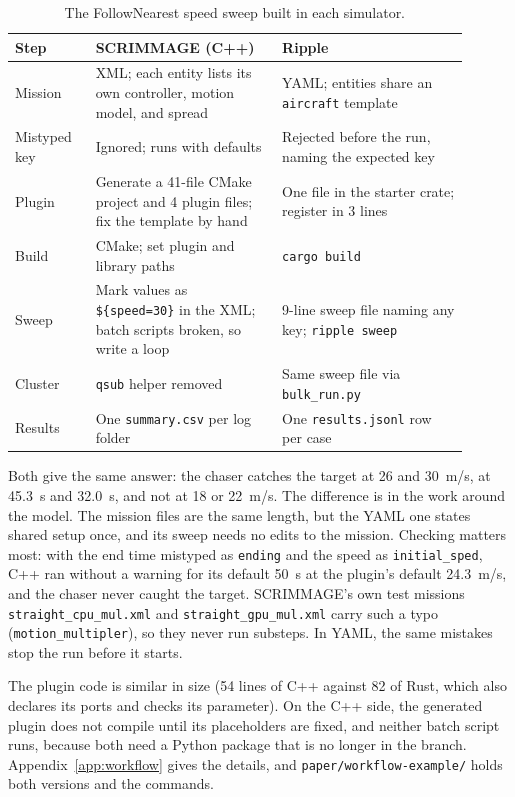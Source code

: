\documentclass[conference]{IEEEtran}
\begin{document}
\begin{table}[t]
\centering
\small
\caption{The FollowNearest speed sweep built in each simulator.}
\label{tab:workflow}
\begin{tabular}{@{}p{0.16\linewidth}p{0.37\linewidth}p{0.37\linewidth}@{}}
\toprule
Step & SCRIMMAGE (C++) & Ripple \\
\midrule
Mission & XML; each entity lists its own controller, motion model, and spread & YAML; entities share an \texttt{aircraft} template \\
Mistyped key & Ignored; runs with defaults & Rejected before the run, naming the expected key \\
Plugin & Generate a 41-file CMake project and 4 plugin files; fix the template by hand & One file in the starter crate; register in 3 lines \\
Build & CMake; set plugin and library paths & \texttt{cargo build} \\
Sweep & Mark values as \texttt{\$\{speed=30\}} in the XML; batch scripts broken, so write a loop & 9-line sweep file naming any key; \texttt{ripple sweep} \\
Cluster & \texttt{qsub} helper removed & Same sweep file via \texttt{bulk\_run.py} \\
Results & One \texttt{summary.csv} per log folder & One \texttt{results.jsonl} row per case \\
\bottomrule
\end{tabular}
\end{table}

Both give the same answer: the chaser catches the target at 26 and 30~m/s, at
45.3~s and 32.0~s, and not at 18 or 22~m/s. The difference is in the work
around the model. The mission files are the same length, but the YAML one
states shared setup once, and its sweep needs no edits to the mission. Checking
matters most: with the end time mistyped as \texttt{ending} and the speed as
\texttt{initial\_sped}, C++ ran without a warning for its default 50~s at the
plugin's default 24.3~m/s, and the chaser never caught the target. SCRIMMAGE's
own test missions \texttt{straight\_cpu\_mul.xml} and
\texttt{straight\_gpu\_mul.xml}
carry such a typo (\texttt{motion\_multipler}), so they never run substeps. In
YAML, the same mistakes stop the run before it starts.

The plugin code is similar in size (54 lines of C++ against 82 of Rust, which
also declares its ports and checks its parameter). On the C++ side, the
generated plugin does not compile until its placeholders are fixed, and neither
batch script runs, because both need a Python package that is no longer in the
branch. Appendix~\ref{app:workflow} gives the details, and \texttt{paper/workflow-example/} holds
both versions and the commands.
\end{document}
